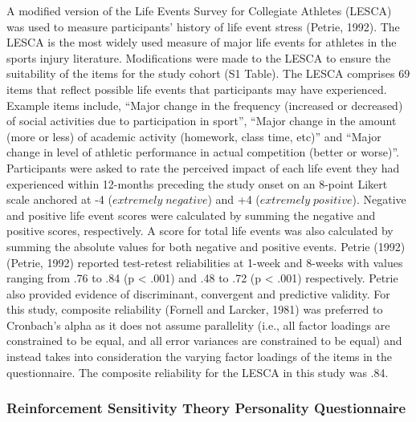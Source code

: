 \documentclass[
]{frontiersHLTH}
\begin{document}
A modified version of the Life Events Survey for Collegiate Athletes
(LESCA) was used to measure participants' history of life event stress
(Petrie, 1992). The LESCA is the most widely used measure of major life
events for athletes in the sports injury literature. Modifications were
made to the LESCA to ensure the suitability of the items for the study
cohort (S1 Table). The LESCA comprises 69 items that reflect possible
life events that participants may have experienced. Example items
include, ``Major change in the frequency (increased or decreased) of
social activities due to participation in sport'', ``Major change in the
amount (more or less) of academic activity (homework, class time, etc)''
and ``Major change in level of athletic performance in actual
competition (better or worse)''. Participants were asked to rate the
perceived impact of each life event they had experienced within
12-months preceding the study onset on an 8-point Likert scale anchored
at -4 (\(extremely\;negative\)) and +4 (\(extremely\;positive\)).
Negative and positive life event scores were calculated by summing the
negative and positive scores, respectively. A score for total life
events was also calculated by summing the absolute values for both
negative and positive events. Petrie (1992) (Petrie, 1992) reported
test-retest reliabilities at 1-week and 8-weeks with values ranging from
.76 to .84 (p \textless{} .001) and .48 to .72 (p \textless{} .001)
respectively. Petrie also provided evidence of discriminant, convergent
and predictive validity. For this study, composite reliability (Fornell
and Larcker, 1981) was preferred to Cronbach's alpha as it does not
assume parallelity (i.e., all factor loadings are constrained to be
equal, and all error variances are constrained to be equal) and instead
takes into consideration the varying factor loadings of the items in the
questionnaire. The composite reliability for the LESCA in this study was
.84.

\hypertarget{reinforcement-sensitivity-theory-personality-questionnaire}{%
\subsubsection{Reinforcement Sensitivity Theory Personality
Questionnaire}\label{reinforcement-sensitivity-theory-personality-questionnaire}}
\end{document}

